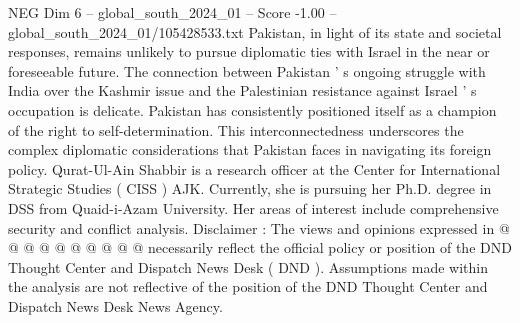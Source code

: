 \begin{textsample}{NEG Dim 6 – global\_south\_2024\_01 – Score -1.00 – global\_south\_2024\_01/105428533.txt}
Pakistan, in light of its state and societal responses, remains unlikely to pursue diplomatic ties with Israel in the near or foreseeable future.
The connection between Pakistan ' s ongoing struggle with India over the Kashmir issue and the Palestinian resistance against Israel ' s occupation is delicate.
Pakistan has consistently positioned itself as a champion of the right to self-determination.
This interconnectedness underscores the complex diplomatic considerations that Pakistan faces in navigating its foreign policy.
Qurat-Ul-Ain Shabbir is a research officer at the Center for International Strategic Studies ( CISS ) AJK.
Currently, she is pursuing her Ph.D. degree in DSS from Quaid-i-Azam University.
Her areas of interest include comprehensive security and conflict analysis.
Disclaimer : The views and opinions expressed in @ @ @ @ @ @ @ @ @ @ necessarily reflect the official policy or position of the DND Thought Center and Dispatch News Desk ( DND ).
Assumptions made within the analysis are not reflective of the position of the DND Thought Center and Dispatch News Desk News Agency.

\end{textsample}
